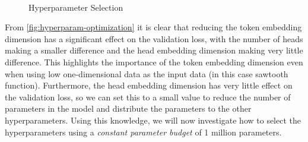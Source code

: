\documentclass[../../main.tex]{subfiles}
\begin{document}
\begin{figure}[H]
	\centering
	\\
	\caption{Hyperparameter Selection}
	\label{fig:hyperparam-optimization}
\end{figure}

From \autoref{fig:hyperparam-optimization} it is clear that reducing the token embedding dimension has a significant effect on the validation loss, with the number of heads making a smaller difference and the head embedding dimension making very little difference. This highlights the importance of the token embedding dimension even when using low one-dimensional data as the input data (in this case sawtooth function). Furthermore, the head embedding dimension has very little effect on the validation loss, so we can set this to a small value to reduce the number of parameters in the model and distribute the parameters to the other hyperparameters. Using this knowledge, we will now investigate how to select the hyperparameters using a \emph{constant parameter budget} of 1 million parameters. 
\end{document}
